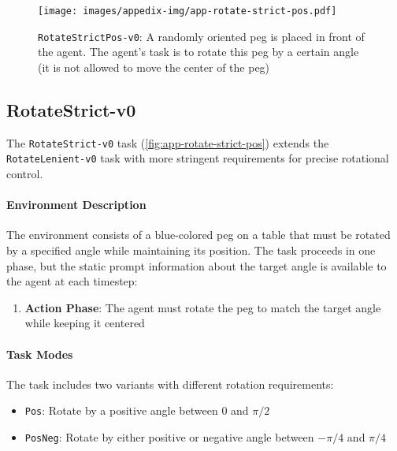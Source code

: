 \newpage
\begin{figure*}[h!]
    \centering
    \texttt{[image: images/appedix-img/app-rotate-strict-pos.pdf]}
    \vspace{-15pt}
    \caption{\texttt{RotateStrictPos-v0}: A randomly oriented peg is placed in front of the agent. The agent's task is to rotate this peg by a certain angle (it is not allowed to move the center of the peg)}
    \label{fig:app-rotate-strict-pos}
    \vspace{-15pt}
\end{figure*}
\subsection{RotateStrict-v0}
\label{app:rotate-strict}

The \texttt{RotateStrict-v0} task (\autoref{fig:app-rotate-strict-pos}) extends the \texttt{RotateLenient-v0} task with more stringent requirements for precise rotational control.

\paragraph{Environment Description} The environment consists of a blue-colored peg on a table that must be rotated by a specified angle while maintaining its position. The task proceeds in one phase, but the static prompt information about the target angle is available to the agent at each timestep:
\begin{enumerate}
    \item \textbf{Action Phase}: The agent must rotate the peg to match the target angle while keeping it centered
\end{enumerate}

\paragraph{Task Modes} The task includes two variants with different rotation requirements:
\begin{itemize}
    \item \texttt{Pos}: Rotate by a positive angle between 0 and $\pi/2$
    \item \texttt{PosNeg}: Rotate by either positive or negative angle between $-\pi/4$ and $\pi/4$
\end{itemize}

